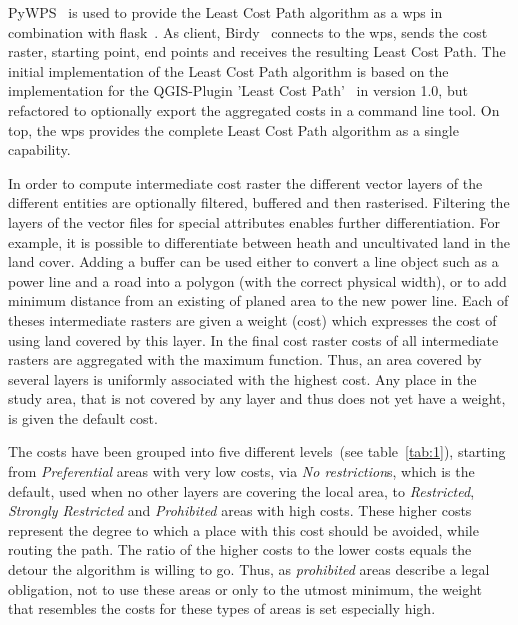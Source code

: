 PyWPS~\cite{noauthor_welcome_2016} is used to provide the Least Cost Path algorithm as a \acrshort{wps} in combination with flask~\cite{noauthor_flask_nodate}.
As client, Birdy~\cite{noauthor_birdy_nodate} connects to the \acrshort{wps}, sends the cost raster, starting point, end points and receives the resulting Least Cost Path.
The initial implementation of the Least Cost Path algorithm is based on the implementation for the QGIS-Plugin
'Least Cost Path'~\cite{noauthor_leastcostpathdijkstra_algorithmpy_2022} in version 1.0, but refactored to optionally export the aggregated costs in a command line tool.
On top, the \acrshort{wps} provides the complete Least Cost Path algorithm as a single capability.

In order to compute intermediate cost raster the different vector layers of the different entities are optionally filtered, buffered and then rasterised.
Filtering the layers of the vector files for special attributes enables further differentiation.
For example, it is possible to differentiate between heath and uncultivated land in the land cover.
Adding a buffer can be used either to convert a line object such as a power line and a road into a polygon (with the
correct physical width), or to add minimum distance from an existing of planed area to the new power line.
Each of theses intermediate rasters are given a weight (cost) which expresses the cost of using land covered by this layer.
In the final cost raster costs of all intermediate rasters are aggregated with the maximum function.
Thus, an area covered by several layers is uniformly associated with the highest cost.
Any place in the study area, that is not covered by any layer and thus does not yet have a weight, is given the default cost.

The costs have been grouped into five different levels~(see table~\ref{tab:1}), starting from \textit{Preferential} areas with
very low costs, via \textit{No restriction}s, which is the default, used when no other layers are covering the local area,
to \textit{Restricted}, \textit{Strongly Restricted} and \textit{Prohibited} areas with high costs.
These higher costs represent the degree to which a place with this cost should be avoided, while routing the path.
The ratio of the higher costs to the lower costs equals the detour
the algorithm is willing to go.
Thus, as \textit{prohibited} areas describe a legal obligation, not to use these areas or only to the utmost minimum,
the weight that resembles the costs for these types of areas is set especially high.\\

